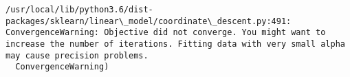 \documentclass[11pt]{article}
\begin{document}
    \begin{Verbatim}[commandchars=\\\{\}]
/usr/local/lib/python3.6/dist-packages/sklearn/linear\_model/coordinate\_descent.py:491: ConvergenceWarning: Objective did not converge. You might want to increase the number of iterations. Fitting data with very small alpha may cause precision problems.
  ConvergenceWarning)

    \end{Verbatim}

    \begin{center}
    \end{center}
    { \hspace*{\fill} \\}
    
    \begin{center}
    \end{center}
    { \hspace*{\fill} \\}
    
    \begin{center}
    \end{center}
    { \hspace*{\fill} \\}
    
    \begin{center}
    \end{center}
    { \hspace*{\fill} \\}
    
    \begin{center}
    \end{center}
    { \hspace*{\fill} \\}
    
    \begin{center}
    \end{center}
    { \hspace*{\fill} \\}
    
    \begin{center}
    \end{center}
    { \hspace*{\fill} \\}
    
\end{document}
